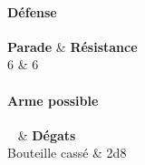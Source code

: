 \paragraph{Défense}
\begin{itemtable}[ c c ]
    \textbf{Parade}     & \textbf{Résistance} \\
    6                   & 6
\end{itemtable}

\paragraph{Arme possible}
\begin{itemtable}[ X c c ]
    ~                & \textbf{Dégats} \\
    Bouteille cassé  & 2d8
\end{itemtable}


\newpage
